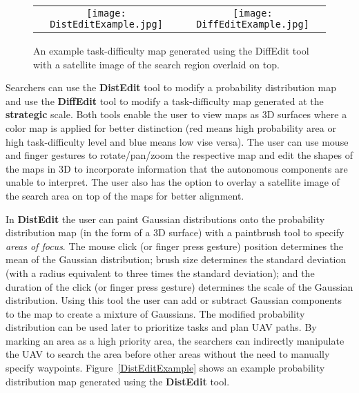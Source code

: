 \begin{figure}
\centering
\begin{tabular}{cc}
	\begin{minipage}{0.45\textwidth}
	\centering
	\texttt{[image: DistEditExample.jpg]}
	\caption{An example probability distribution map generated using the DistEdit tool.}
	\label{DistEditExample}
	\end{minipage}
&
	\begin{minipage}{0.45\textwidth}
	\centering
	\texttt{[image: DiffEditExample.jpg]}
	\caption{An example task-difficulty map generated using the DiffEdit tool with a satellite image of the search region overlaid on top.}
	\label{DiffEditExample}
	\end{minipage}
\end{tabular}
\end{figure}

Searchers can use the \textbf{DistEdit} tool to modify a probability distribution map and use the \textbf{DiffEdit} tool to modify a task-difficulty map generated at the \textbf{strategic} scale. Both tools enable the user to view maps as 3D surfaces where a color map is applied for better distinction (red means high probability area or high task-difficulty level and blue means low vise versa). The user can use mouse and finger gestures to rotate/pan/zoom the respective map and edit the shapes of the maps in 3D to incorporate information that the autonomous components are unable to interpret. The user also has the option to overlay a satellite image of the search area on top of the maps for better alignment.

In \textbf{DistEdit} the user can paint Gaussian distributions onto the probability distribution map (in the form of a 3D surface) with a paintbrush tool to specify \textit{areas of focus}. The mouse click (or finger press gesture) position determines the mean of the Gaussian distribution; brush size determines the standard deviation (with a radius equivalent to three times the standard deviation); and the duration of the click (or finger press gesture) determines the scale of the Gaussian distribution. Using this tool the user can add or subtract Gaussian components to the map to create a mixture of Gaussians. The modified probability distribution can be used later to prioritize tasks and plan UAV paths. By marking an area as a high priority area, the searchers can indirectly manipulate the UAV to search the area before other areas without the need to manually specify waypoints. Figure~\ref{DistEditExample} shows an example probability distribution map generated using the \textbf{DistEdit} tool.

